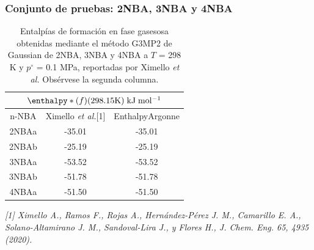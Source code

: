 \documentclass{beamer}
\begin{document}
\begin{frame}
\frametitle{Conjunto de pruebas: 2NBA, 3NBA y 4NBA}
\begin{table}[H]
\centering
\begin{tabular}{|c|c|c|}
\hline
	\multicolumn{3}{||c||}{$\enthalpy*(f){}(298.15 \mathrm{K})\; \mathrm{kJ\;mol^{-1}}$}\\
\hline
\hline
	n-NBA & Ximello \textit{et al.}[1] & EnthalpyArgonne\\ 
\hline
2NBAa & -35.01 & -35.01\\
\hline
2NBAb & -25.19 & -25.19\\ 
\hline 
3NBAa & -53.52 & -53.52\\
\hline
3NBAb & -51.78 & -51.78\\ 
\hline
4NBAa & -51.50 & -51.50\\ 
\hline  
\end{tabular} 
	\caption{Entalpías de formación en fase gasesosa obtenidas mediante el método G3MP2 de Gaussian de 2NBA, 3NBA y 4NBA a $T$ = 298 K y $p^{\circ}$ = 0.1 MPa, reportadas por Ximello \textit{et al.} Obsérvese la segunda columna.}
\label{Ximello-table-3}
\end{table}
\textit{\tiny{[1] Ximello A., Ramos F., Rojas A., Hernández-Pérez J. M., Camarillo E. A., Solano-Altamirano J. M., Sandoval-Lira J., y Flores H., J. Chem. Eng. 65, 4935 (2020).}}
\end{frame}


\end{document}
